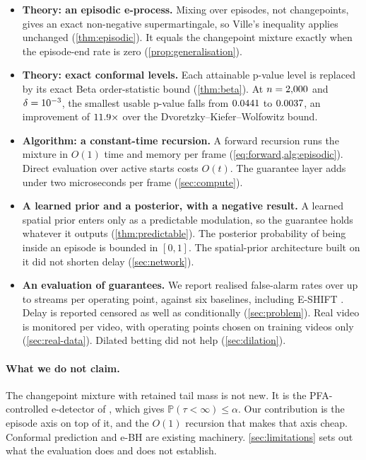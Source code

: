 \begin{itemize}
\item \textbf{Theory: an episodic e-process.} Mixing over episodes, not
      changepoints, gives an exact non-negative supermartingale, so Ville's
      inequality applies unchanged (\cref{thm:episodic}). It equals the changepoint
      mixture exactly when the episode-end rate is zero (\cref{prop:generalisation}).

\item \textbf{Theory: exact conformal levels.} Each attainable p-value level is
      replaced by its exact Beta order-statistic bound (\cref{thm:beta}). At
      $n=2{,}000$ and $\delta=10^{-3}$, the smallest usable p-value falls from
      $0.0441$ to $0.0037$, an improvement of $11.9\times$ over
      the Dvoretzky--Kiefer--Wolfowitz bound.

\item \textbf{Algorithm: a constant-time recursion.} A forward recursion runs the
      mixture in $O(1)$ time and memory per frame (\cref{eq:forward,alg:episodic}).
      Direct evaluation over active starts costs $O(t)$. The guarantee layer adds
      under two microseconds per frame (\cref{sec:compute}).

\item \textbf{A learned prior and a posterior, with a negative result.} A learned
      spatial prior enters only as a predictable modulation, so the guarantee holds
      whatever it outputs (\cref{thm:predictable}). The posterior probability of
      being inside an episode is bounded in $[0,1]$. The spatial-prior architecture
      built on it did not shorten delay (\cref{sec:network}).

\item \textbf{An evaluation of guarantees.} We report realised false-alarm rates
      over up to \ExpOneReps{} streams per operating point, against six baselines,
      including E-SHIFT \citep{khan2026eshift}. Delay is reported censored as well as
      conditionally (\cref{sec:problem}). Real video is monitored per video, with
      operating points chosen on training videos only (\cref{sec:real-data}).
      Dilated betting did not help (\cref{sec:dilation}).
\end{itemize}

\paragraph{What we do not claim.}
The changepoint mixture with retained tail mass is not new. It is the
PFA-controlled e-detector of \citet{saha2026nonpartitioned}, which gives
$\mathbb{P}(\tau<\infty)\le\alpha$. Our contribution is the episode axis on top of
it, and the $O(1)$ recursion that makes that axis cheap. Conformal prediction and
e-BH are existing machinery. \cref{sec:limitations} sets out what the evaluation
does and does not establish.
